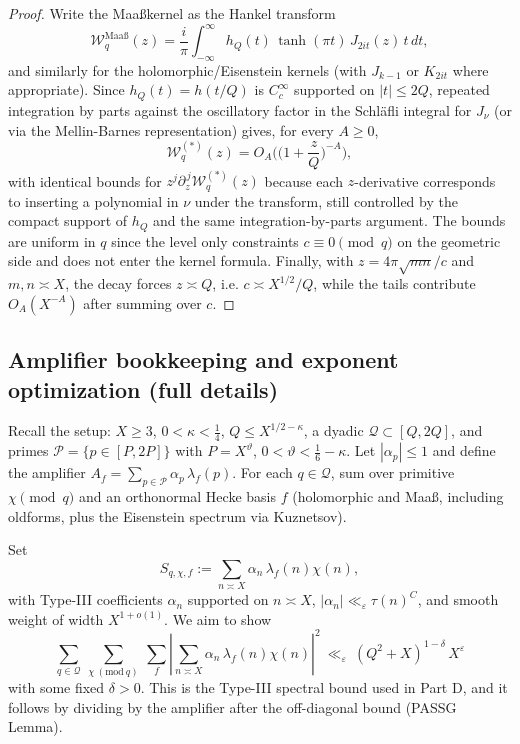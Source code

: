 \documentclass[11pt]{article}
\theoremstyle{definition}
\theoremstyle{remark}
\numberwithin{equation}{part}
\begin{document}
\begin{proof}
	Write the Maa\ss kernel as the Hankel transform
	\[
		\mathcal W_q^{\mathrm{Maa\text{\ss}}}(z) = \frac{i}{\pi}\int_{-\infty}^{\infty} h_Q(t)\,\tanh(\pi t)\,J_{2it}(z)\,t\,dt,
	\]
	and similarly for the holomorphic/Eisenstein kernels (with $J_{k-1}$ or $K_{2it}$ where appropriate). Since $h_Q(t)=h(t/Q)$ is $C_c^\infty$ supported on $|t|\le 2Q$, repeated integration by parts against the oscillatory factor in the Schl\"afli integral for $J_\nu$ (or via the Mellin-Barnes representation) gives, for every $A\ge 0$,
	\[
		\mathcal W_q^{(*)}(z)=O_A\!\Big(\Big(1+\frac{z}{Q}\Big)^{-A}\Big),
	\]
	with identical bounds for $z^j\partial_z^{\,j}\mathcal W_q^{(*)}(z)$ because each $z$-derivative corresponds to inserting a polynomial in $\nu$ under the transform, still controlled by the compact support of $h_Q$ and the same integration-by-parts argument. The bounds are uniform in $q$ since the level only constraints $c\equiv 0\pmod q$ on the geometric side and does not enter the kernel formula.
	Finally, with $z=4\pi\sqrt{mn}/c$ and $m,n\asymp X$, the decay forces $z\asymp Q$, i.e. $c\asymp X^{1/2}/Q$, while the tails contribute $O_A(X^{-A})$ after summing over $c$.
\end{proof}

\subsection{Amplifier bookkeeping and exponent optimization (full details)}

Recall the setup: $X\ge 3$, $0<\kappa<\tfrac14$, $Q\le X^{1/2-\kappa}$, a dyadic $\mathcal Q\subset[Q,2Q]$,
and primes $\mathcal P=\{p\in[P,2P]\}$ with $P=X^\vartheta$, $0<\vartheta<\tfrac16-\kappa$.
Let $|\alpha_p|\le 1$ and define the amplifier $A_f=\sum_{p\in\mathcal P}\alpha_p\,\lambda_f(p)$.
For each $q\in\mathcal Q$, sum over primitive $\chi\pmod q$ and an orthonormal Hecke basis $f$
(holomorphic and Maaß, including oldforms, plus the Eisenstein spectrum via Kuznetsov).

Set
\[
	S_{q,\chi,f}:=\sum_{n\asymp X}\alpha_n\,\lambda_f(n)\chi(n),
\]
with Type-III coefficients $\alpha_n$ supported on $n\asymp X$,
$|\alpha_n|\ll_\varepsilon \tau(n)^C$, and smooth weight of width $X^{1+o(1)}$.
We aim to show
\begin{equation}\label{eq:TypeIIIgoal}
	\sum_{q\in\mathcal Q}\ \sum_{\chi\ (\mathrm{mod}\ q)}\ \sum_f
	\left|\sum_{n\asymp X}\alpha_n\,\lambda_f(n)\chi(n)\right|^2
	\ \ll_\varepsilon\ (Q^2+X)^{1-\delta}\,X^{\varepsilon}
\end{equation}
with some fixed $\delta>0$. This is the Type-III spectral bound used in Part D,
and it follows by dividing by the amplifier after the off-diagonal bound (PASSG Lemma).
\end{document}
